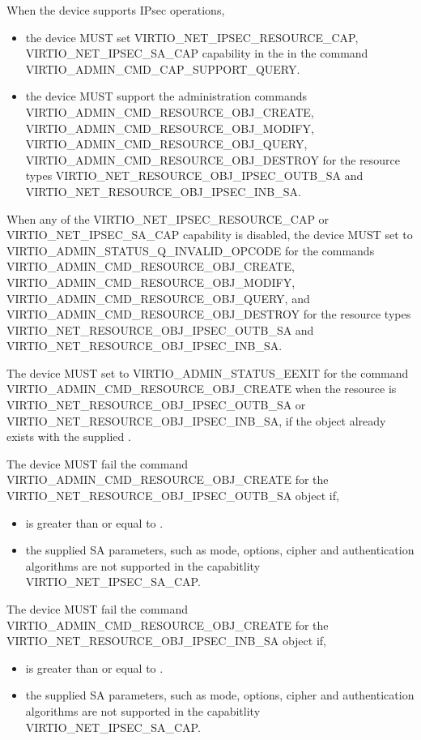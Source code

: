 
When the device supports IPsec operations,
\begin{itemize}
\item the device MUST set VIRTIO_NET_IPSEC_RESOURCE_CAP, VIRTIO_NET_IPSEC_SA_CAP
capability in the  in the command VIRTIO_ADMIN_CMD_CAP_SUPPORT_QUERY.
\item the device MUST support the administration commands
VIRTIO_ADMIN_CMD_RESOURCE_OBJ_CREATE,
VIRTIO_ADMIN_CMD_RESOURCE_OBJ_MODIFY, VIRTIO_ADMIN_CMD_RESOURCE_OBJ_QUERY,
VIRTIO_ADMIN_CMD_RESOURCE_OBJ_DESTROY for the resource types
VIRTIO_NET_RESOURCE_OBJ_IPSEC_OUTB_SA and VIRTIO_NET_RESOURCE_OBJ_IPSEC_INB_SA.
\end{itemize}

When any of the VIRTIO_NET_IPSEC_RESOURCE_CAP or VIRTIO_NET_IPSEC_SA_CAP
capability is disabled, the device MUST set  to
VIRTIO_ADMIN_STATUS_Q_INVALID_OPCODE for the commands
VIRTIO_ADMIN_CMD_RESOURCE_OBJ_CREATE,
VIRTIO_ADMIN_CMD_RESOURCE_OBJ_MODIFY, VIRTIO_ADMIN_CMD_RESOURCE_OBJ_QUERY,
and VIRTIO_ADMIN_CMD_RESOURCE_OBJ_DESTROY for the resource types
VIRTIO_NET_RESOURCE_OBJ_IPSEC_OUTB_SA and VIRTIO_NET_RESOURCE_OBJ_IPSEC_INB_SA.

The device MUST set  to VIRTIO_ADMIN_STATUS_EEXIT for the
command VIRTIO_ADMIN_CMD_RESOURCE_OBJ_CREATE when the resource 
is VIRTIO_NET_RESOURCE_OBJ_IPSEC_OUTB_SA or VIRTIO_NET_RESOURCE_OBJ_IPSEC_INB_SA,
if the object already exists with the supplied .

The device MUST fail the command VIRTIO_ADMIN_CMD_RESOURCE_OBJ_CREATE for the
VIRTIO_NET_RESOURCE_OBJ_IPSEC_OUTB_SA object if,
\begin{itemize}
\item {} is greater than or equal to .
\item the supplied SA parameters, such as mode, options, cipher and authentication
      algorithms are not supported in the capabitlity VIRTIO_NET_IPSEC_SA_CAP.
\end{itemize}

The device MUST fail the command VIRTIO_ADMIN_CMD_RESOURCE_OBJ_CREATE for the
VIRTIO_NET_RESOURCE_OBJ_IPSEC_INB_SA object if,
\begin{itemize}
\item {} is greater than or equal to .
\item the supplied SA parameters, such as mode, options, cipher and authentication
      algorithms are not supported in the capabitlity VIRTIO_NET_IPSEC_SA_CAP.
\end{itemize}

